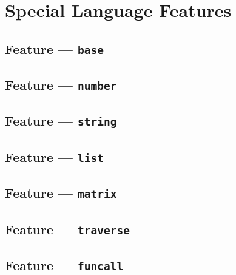 
\section{Special Language Features} %
\label{sec:special_language_features}

\subsection{Feature --- \texttt{base}} %
\label{sub:feature_base}


\subsection{Feature --- \texttt{number}} %
\label{sub:feature_number}


\subsection{Feature --- \texttt{string}} %
\label{sub:feature_string}


\subsection{Feature --- \texttt{list}} %
\label{sub:feature_list}


\subsection{Feature --- \texttt{matrix}} %
\label{sub:feature_matrix}


\subsection{Feature --- \texttt{traverse}} %
\label{sub:feature_traverse}


\subsection{Feature --- \texttt{funcall}} %
\label{sub:feature_funcall}



